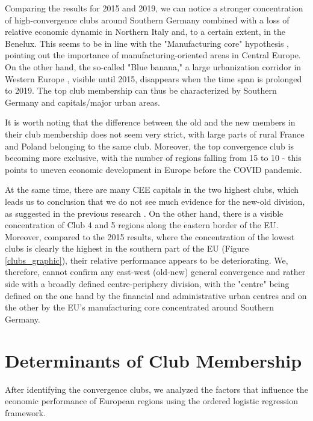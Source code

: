 \documentclass[11pt]{article}
\begin{document}
Comparing the results for 2015 and 2019, we can notice a stronger concentration of high-convergence clubs around Southern Germany combined with a loss of relative economic dynamic in Northern Italy and, to a certain extent, in the Benelux. This seems to be in line with the "Manufacturing core" hypothesis \citep{cutrini2019economic, stollinger2016structural}, pointing out the importance of manufacturing-oriented areas in Central Europe. On the other hand, the so-called "Blue banana," a large urbanization corridor in Western Europe \citep{hospers2002beyond}, visible until 2015, disappears when the time span is prolonged to 2019. The top club membership can thus be characterized by Southern Germany and capitals/major urban areas.

It is worth noting that the difference between the old and the new members in their club membership does not seem very strict, with large parts of rural France and Poland belonging to the same club. Moreover, the top convergence club is becoming more exclusive, with the number of regions falling from 15 to 10 - this points to uneven economic development in Europe before the COVID pandemic.

At the same time, there are many CEE capitals in the two highest clubs, which leads us to conclusion that we do not see much evidence for the new-old division, as suggested in the previous research \citep{eckey2007convergence}.
On the other hand, there is a visible concentration of Club 4 and 5 regions along the eastern border of the EU. Moreover, compared to the 2015 results, where the concentration of the lowest clubs is clearly the highest in the southern part of the EU (Figure \ref{clubs_graphic}), their relative performance appears to be deteriorating. We, therefore, cannot confirm any east-west (old-new) general convergence and rather side with a broadly defined centre-periphery division, with the "centre" being defined on the one hand by the financial and administrative urban centres and on the other by the EU's manufacturing core concentrated around Southern Germany.



\section{Determinants of Club Membership}
\label{Determinants of club membership}


 
After identifying the convergence clubs, we analyzed the factors that influence the economic performance of European regions using the ordered logistic regression framework.
\end{document}
